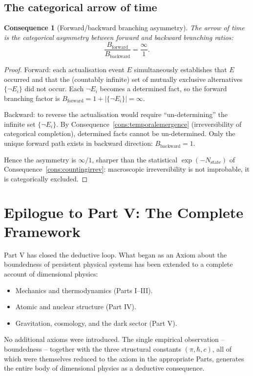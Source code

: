 \documentclass[11pt,twocolumn,a4paper]{article}
\theoremstyle{axiomstyle}
\theoremstyle{conseqstyle}
\newtheorem{consequence}{Consequence}
\theoremstyle{definition}
\theoremstyle{remark}
\begin{document}
\subsection{The categorical arrow of time}

\begin{consequence}[Forward/backward branching asymmetry]\label{cons:branchingarrow}
The arrow of time is the categorical asymmetry between forward and backward branching ratios:
\begin{equation}
\frac{B_{\mathrm{forward}}}{B_{\mathrm{backward}}}=\frac{\infty}{1}.
\end{equation}
\end{consequence}

\begin{proof}
Forward: each actualisation event $E$ simultaneously establishes that $E$ occurred and that the (countably infinite) set of mutually exclusive alternatives $\{\neg E_{i}\}$ did not occur. Each $\neg E_{i}$ becomes a determined fact, so the forward branching factor is $B_{\mathrm{forward}}=1+|\{\neg E_{i}\}|=\infty$.

Backward: to reverse the actualisation would require ``un-determining'' the infinite set $\{\neg E_{i}\}$. By Consequence~\ref{cons:temporalemergence} (irreversibility of categorical completion), determined facts cannot be un-determined. Only the unique forward path exists in backward direction: $B_{\mathrm{backward}}=1$.

Hence the asymmetry is $\infty/1$, sharper than the statistical $\exp(-N_{\mathrm{state}})$ of Consequence~\ref{cons:countingirrev}: macroscopic irreversibility is not improbable, it is categorically excluded.
\end{proof}

\section*{Epilogue to Part V: The Complete Framework}

Part V has closed the deductive loop. What began as an Axiom about the boundedness of persistent physical systems has been extended to a complete account of dimensional physics:
\begin{itemize}[nosep]
\item Mechanics and thermodynamics (Parts I--III).
\item Atomic and nuclear structure (Part IV).
\item Gravitation, cosmology, and the dark sector (Part V).
\end{itemize}
No additional axioms were introduced. The single empirical observation -- boundedness -- together with the three structural constants $(\pi,\hbar,c)$, all of which were themselves reduced to the axiom in the appropriate Parts, generates the entire body of dimensional physics as a deductive consequence.
\end{document}
